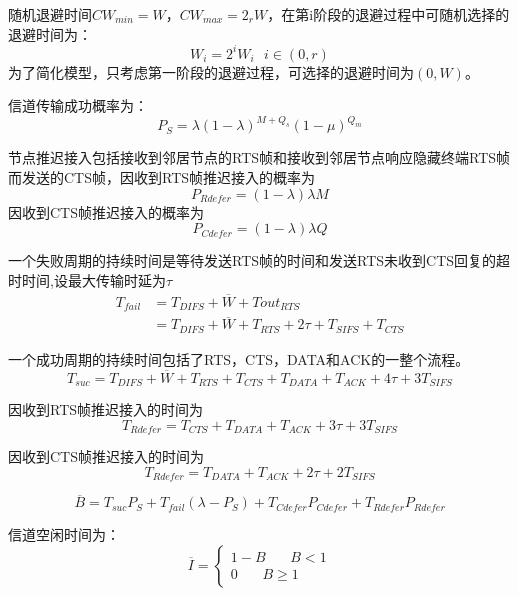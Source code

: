 随机退避时间$CW_{min}=W$，$CW_{max}=2_r W$，在第i阶段的退避过程中可随机选择的退避时间为：
\begin{equation}
W_i=2^iW_i \ \ \ i\in(0,r)
\end{equation}
为了简化模型，只考虑第一阶段的退避过程，可选择的退避时间为$(0,W)$。

信道传输成功概率为：
\begin{equation}
P_S=\lambda(1-\lambda)^{M+Q_s}(1-\mu)^{Q_m}
\end{equation}

节点推迟接入包括接收到邻居节点的RTS帧和接收到邻居节点响应隐藏终端RTS帧而发送的CTS帧，因收到RTS帧推迟接入的概率为
\begin{equation}
 P_{Rdefer}=(1-\lambda)\lambda M
\end{equation}
因收到CTS帧推迟接入的概率为
\begin{equation}
 P_{Cdefer}=(1-\lambda)\lambda Q
\end{equation}

一个失败周期的持续时间是等待发送RTS帧的时间和发送RTS未收到CTS回复的超时时间,设最大传输时延为$\tau$
\begin{equation}
\begin{aligned}
T_{fail}&=T_{DIFS}+\overline W+Tout_{RTS}\\
&=T_{DIFS}+\overline W+T_{RTS}+2\tau+T_{SIFS}+T_{CTS}
\end{aligned}
\end{equation}

一个成功周期的持续时间包括了RTS，CTS，DATA和ACK的一整个流程。
\begin{equation}
T_{suc}=T_{DIFS}+\overline W+T_{RTS}+T_{CTS}+T_{DATA}+T_{ACK}+4\tau+3T_{SIFS}
\end{equation}

因收到RTS帧推迟接入的时间为
\begin{equation}
T_{Rdefer}=T_{CTS}+T_{DATA}+T_{ACK}+3\tau+3T_{SIFS}
\end{equation}

因收到CTS帧推迟接入的时间为
\begin{equation}
T_{Rdefer}=T_{DATA}+T_{ACK}+2\tau+2T_{SIFS}
\end{equation}

\begin{equation}
\overline B=T_{suc}P_S+T_{fail}(\lambda-P_S )+ T_{Cdefer}P_{Cdefer}+T_{Rdefer}P_{Rdefer}
\end{equation}

信道空闲时间为：
\begin{equation}
\overline I=\left\{
\begin{aligned}
1-B \ \ \ \ \ \ \ \ B<1\\
0\ \ \ \ \ \ \ \    B\ge 1
\end{aligned}
\right.
\end{equation}

